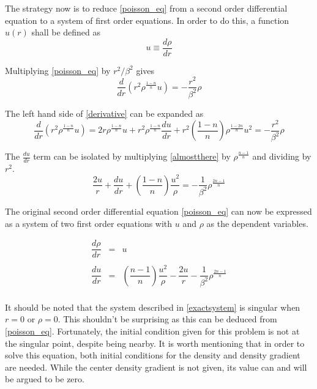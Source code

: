 \documentclass[11pt,letterpaper]{article}
\begin{document}
The strategy now is to reduce \eqref{poisson_eq} from a second order
differential equation to a system of first order equations. In order to do this,
a function $u\left(r\right)$ shall be defined as
\begin{equation}
    u \equiv \frac{d\rho}{dr}
\end{equation}

Multiplying \eqref{poisson_eq} by $r^2 / \beta^2$ gives
\begin{equation}
    \frac{d}{dr}\left(r^2\rho^\frac{1-n}{n}u\right) = -\frac{r^2}{\beta^2}\rho
    \label{derivative}
\end{equation}

The left hand side of \eqref{derivative} can be expanded as
\begin{equation}
    \frac{d}{dr}\left(r^2\rho^\frac{1-n}{n}u\right) =
    2r \rho^\frac{1-n}{n}u + r^2 \rho^\frac{1-n}{n} \frac{du}{dr} +
    r^2 \left(\frac{1-n}{n}\right) \rho^\frac{1-2n}{n} u^2
    = -\frac{r^2}{\beta^2}\rho
    \label{almostthere}
\end{equation}

The $\frac{du}{dr}$ term can be isolated by multiplying \eqref{almostthere} by
$\rho^\frac{n-1}{n}$ and dividing by $r^2$.
\begin{equation}
    \frac{2u}{r} + \frac{du}{dr} + \left(\frac{1-n}{n}\right)\frac{u^2}{\rho}
    = -\frac{1}{\beta^2} \rho^\frac{2n-1}{n}
\end{equation}

The original second order differential equation \eqref{poisson_eq} can now be
expressed as a system of two first order equations with $u$ and $\rho$ as the
dependent variables.

\begin{equation}
    \begin{array}{rcl}
        \dfrac{d\rho}{dr} & = & u\\
        \ \\
        \dfrac{du}{dr} & = & \left(\dfrac{n-1}{n}\right)\dfrac{u^2}{\rho}
        -\dfrac{2u}{r} -\dfrac{1}{\beta^2} \rho^\frac{2n-1}{n} \\
    \end{array}
    \label{exactsystem}
\end{equation}

It should be noted that the system described in \eqref{exactsystem} is singular
when $r = 0$ or $\rho = 0$. This shouldn't be surprising as this can be deduced
from \eqref{poisson_eq}. Fortunately, the initial condition given for this
problem is not at the singular point, despite being nearby. It is worth
mentioning that in order to solve this equation, both initial conditions for the
density and density gradient are needed. While the center density gradient is
not given, its value can and will be argued to be zero.
\end{document}
